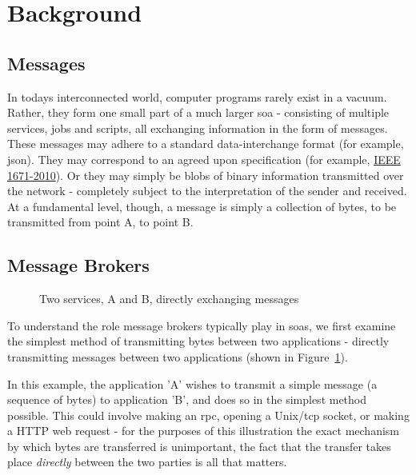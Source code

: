 \section{Background}
\label{sec:Background}

\subsection{Messages}
\label{sub:Messages}

In todays interconnected world, computer programs rarely exist in a vacuum.
Rather, they form one small part of a much larger \gls{soa} -
consisting of multiple services, jobs and scripts, all exchanging information in
the form of messages. These messages may adhere to a standard data-interchange
format (for example, \gls{json}). They may correspond to an agreed upon
specification (for example, \href{https://goo.gl/rjuP4C}{IEEE 1671-2010}).
Or they may simply be blobs of binary information transmitted over the network -
completely subject to the interpretation of the sender and received.
At a fundamental level, though, a message is simply a collection of bytes, to be
transmitted from point A, to point B.

\subsection{Message Brokers}
\label{sub:What is a message broker?}

\begin{figure}[ht]
  \centering
  
  \caption{Two services, A and B, directly exchanging messages}
  \label{fig:tikz:directMessaging}
\end{figure}

To understand the role message brokers typically play in \glspl{soa}, we first
examine the simplest method of transmitting bytes between two applications -
directly transmitting messages between two applications (shown in
Figure~\ref{fig:tikz:directMessaging}).

In this example, the application 'A' wishes to transmit a simple message
(a sequence of bytes) to application 'B', and does so in the simplest method
possible. This could involve making an \gls{rpc}, opening a Unix/\gls{tcp} socket,
or making a HTTP web request - for the purposes of this illustration the exact
mechanism by which bytes are transferred is unimportant, the fact
that the transfer takes place \emph{directly} between the two parties is all that
matters.


